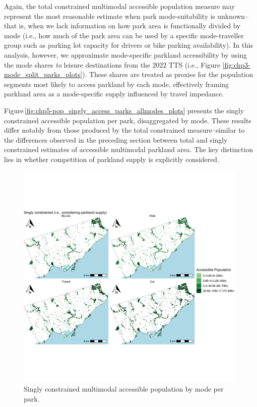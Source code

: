 \documentclass[
11pt, %
oneside, %
english, %
singlespacing, %
]{macthesis} %
\begin{document}
Again, the total constrained multimodal accessible population measure may represent the most reasonable estimate when park mode-suitability is unknown--that is, when we lack information on how park area is functionally divided by mode (i.e., how much of the park area can be used by a specific mode-traveller group such as parking lot capacity for drivers or bike parking availability). In this analysis, however, we approximate mode-specific parkland accessibility by using the mode shares \emph{to} leisure destinations from the 2022 TTS (i.e., Figure \ref{fig:chp3-mode_split_parks_plots}). These shares are treated as proxies for the population segments most likely to access parkland by each mode, effectively framing parkland area as a mode-specific supply influenced by travel impedance.

Figure\,\ref{fig:chp5-pop_singly_access_parks_allmodes_plots} presents the singly constrained accessible population per park, disaggregated by mode. These results differ notably from those produced by the total constrained measure--similar to the differences observed in the preceding section between total and singly constrained estimates of accessible multimodal parkland area. The key distinction lies in whether competition of parkland supply is explicitly considered.

\begin{figure}

{\centering \includegraphics[width=6in]{./data/figures/chp5-pop_singly_access_parks_allmodes_plots} 

}

\caption{\label{fig:chp5-pop_singly_access_parks_allmodes_plots} Singly constrained multimodal accessible population by mode per park.}\label{fig:unnamed-chunk-90}
\end{figure}
\end{document}
